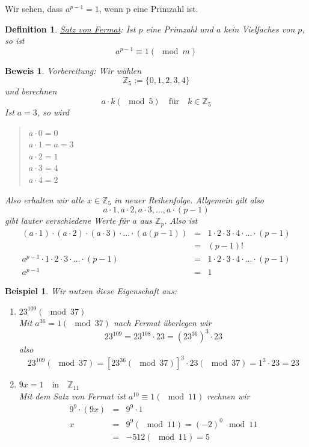 \documentclass{report}
\newtheorem{mydef}{Definition}
\newtheorem{myexample}{Beispiel}
\newtheorem{myproof}{Beweis}
\begin{document}
Wir sehen, dass $a^{p-1} = 1$, wenn p eine Primzahl ist.
\begin{mydef}\underline{Satz von Fermat}: Ist $p$ eine Primzahl und $a$ kein Vielfaches von $p$, so ist
\begin{equation}a^{p-1} \equiv 1 (\mod{m}) \end{equation}\end{mydef}
\begin{myproof}Vorbereitung: Wir wählen
\begin{equation}\mathbb{Z}_5 := \{0, 1, 2, 3, 4\}\end{equation}
und berechnen
\begin{equation}a \cdot k (\mod{5}) \quad \mbox{für} \quad k \in \mathbb{Z}_5 \end{equation}
Ist $a = 3$, so wird
\begin{quote}$a \cdot 0 = 0$\\
$a \cdot 1 = a = 3$\\
$a \cdot 2 = 1$\\
$a \cdot 3 = 4$\\
$a \cdot 4 = 2$\end{quote}
Also erhalten wir alle $x \in \mathbb{Z}_5$ in neuer Reihenfolge. Allgemein gilt also
\begin{equation}a \cdot 1, a \cdot 2, a \cdot 3, ..., a \cdot (p-1)\end{equation}
gibt lauter verschiedene Werte für $a$ aus $\mathbb{Z}_p$. Also ist
\begin{eqnarray}(a \cdot 1) \cdot (a \cdot 2) \cdot (a \cdot 3) \cdot ... \cdot (a(p-1)) & = & 1  \cdot  2 \cdot 3 \cdot 4 \cdot ... \cdot (p-1)\nonumber \\
& = & (p-1)!\nonumber \\
a^{p-1} \cdot 1 \cdot 2 \cdot 3 \cdot ... \cdot (p-1) & = &1 \cdot 2 \cdot 3 \cdot 4 \cdot ... \cdot (p-1)\nonumber \\
a^{p-1} & = & 1\end{eqnarray}
\end{myproof}
\begin{myexample}Wir nutzen diese Eigenschaft aus:\begin{enumerate}
\item $23^{109} (\mod{37})$\\
Mit $a^{36} = 1 (\mod{37})$ nach Fermat überlegen wir
\begin{equation}23^{109} = 23^{108} \cdot 23 = (23^{36})^3 \cdot 23\end{equation}
also
\begin{equation}23^{109} (\mod{37}) = [23^{36} (\mod{37})]^3 \cdot 23 (\mod 37) = 1^3 \cdot 23 = 23\end{equation}
\item $9x = 1 \quad \mbox{in} \quad \mathbb{Z}_{11}$\\
Mit dem Satz von Fermat ist $a^{10} \equiv 1 (\mod{11})$ rechnen wir
\begin{eqnarray}9^9 \cdot (9x) & = & 9^9 \cdot 1\nonumber \\
x & = & 9^9 (\mod{11}) = (-2)^0 \mod{11} \nonumber \\
& = & -512 (\mod{11}) = 5 \end{eqnarray}
\end{enumerate}\end{myexample}
\end{document}
